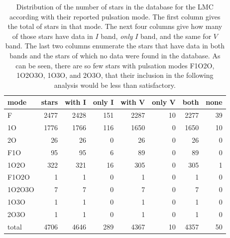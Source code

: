 \begin{table}
	\centering
	\begin{tabular}{l|rrrrrrr}
		mode &     stars &  with I & only I & with V & only V & both &  none \\ \hline\hline
		F      &  2477 &  2428 &       151 &  2287 &        10 &  2277 &    39 \\
		1O     &  1776 &  1766 &       116 &  1650 &         0 &  1650 &    10 \\
		2O     &    26 &    26 &         0 &    26 &         0 &    26 &     0 \\
		F1O    &    95 &    95 &         6 &    89 &         0 &    89 &     0 \\
		1O2O   &   322 &   321 &        16 &   305 &         0 &   305 &     1 \\
		F1O2O  &     1 &     1 &         0 &     1 &         0 &     1 &     0 \\
		1O2O3O &     7 &     7 &         0 &     7 &         0 &     7 &     0 \\
		1O3O   &     1 &     1 &         0 &     1 &         0 &     1 &     0 \\
		2O3O   &     1 &     1 &         0 &     1 &         0 &     1 &     0 \\\hline
		total  &  4706 &  4646 &       289 &  4367 &        10 &  4357 &    50 \\
		\end{tabular}
		\caption[Pulsation mode and filter data distribution for the LMC]{
			Distribution of the number of stars in the database for the LMC according with their reported pulsation mode.
			The first column gives the total of stars in that mode.
			The next four columns give how many of those stars have data in $I$ band, \textit{only} $I$ band, and the same for $V$ band.
			The last two columns enumerate the stars that have data in both bands and the stars of which no data were found in the database.
			As can be seen, there are so few stars with pulsation modes F1O2O, 1O2O3O, 1O3O, and 2O3O, 
			that their inclusion in the following analysis would be less than satisfactory.
		}
		\label{tab:LMC}
\end{table}

